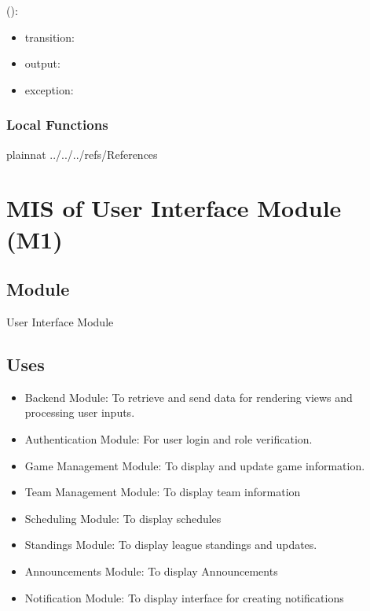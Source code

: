 \documentclass[12pt, titlepage]{article}
\begin{document}
\noindent {}():
\begin{itemize}
\item transition:  
\item output:  
\item exception:  
\end{itemize}



\subsubsection{Local Functions}

 

\newpage

 {plainnat}
 {../../../refs/References}

\newpage

\section{MIS of User Interface Module (M1)} \label{Module:UI}

\subsection{Module}

User Interface Module

\subsection{Uses}

\begin{itemize}
    \item Backend Module: To retrieve and send data for rendering views and processing user inputs.
    \item Authentication Module: For user login and role verification.
    \item Game Management Module: To display and update game information.
    \item Team Management Module: To display team information
    \item Scheduling Module: To display schedules
    \item Standings Module: To display league standings and updates.
    \item Announcements Module: To display Announcements
    \item Notification Module: To display interface for creating notifications
\end{itemize}
\end{document}

